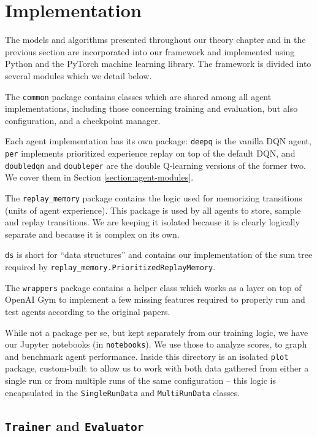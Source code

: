 \section{Implementation} \label{section:implementation}
The models and algorithms presented throughout our theory chapter and in the previous section are incorporated into our framework and implemented using Python and the PyTorch machine learning library.
The framework is divided into several modules which we detail below.

The \verb|common| package contains classes which are shared among all agent implementations, including those concerning training and evaluation, but also configuration, and a checkpoint manager.

Each agent implementation has its own package: \verb|deepq| is the vanilla DQN agent, \verb|per| implements prioritized experience replay on top of the default DQN, and \verb|doubledqn| and \verb|doubleper| are the double Q-learning versions of the former two.
We cover them in Section \ref{section:agent-modules}.

The \verb|replay_memory| package contains the logic used for memorizing transitions (units of agent experience).
This package is used by all agents to store, sample and replay transitions.
We are keeping it isolated because it is clearly logically separate and because it is complex on its own.

\verb|ds| is short for ``data structures'' and contains our implementation of the sum tree required by \verb|replay_memory.PrioritizedReplayMemory|.

The \verb|wrappers| package contains a helper class which works as a layer on top of OpenAI Gym to implement a few missing features required to properly run and test agents according to the original papers.

While not a package per se, but kept separately from our training logic, we have our Jupyter notebooks (in \verb|notebooks|).
We use those to analyze scores, to graph and benchmark agent performance.
Inside this directory is an isolated \verb|plot| package, custom-built to allow us to work with both data gathered from either a single run or from multiple runs of the same configuration -- this logic is encapsulated in the \verb|SingleRunData| and \verb|MultiRunData| classes.

\subsection{\texttt{Trainer} and \texttt{Evaluator}}


